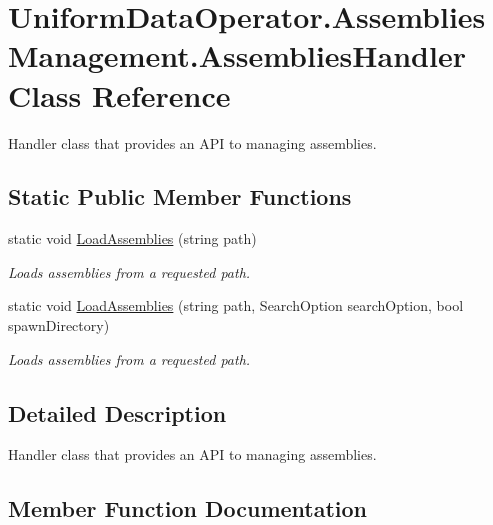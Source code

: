 \hypertarget{class_uniform_data_operator_1_1_assemblies_management_1_1_assemblies_handler}{}\section{Uniform\+Data\+Operator.\+Assemblies\+Management.\+Assemblies\+Handler Class Reference}
\label{class_uniform_data_operator_1_1_assemblies_management_1_1_assemblies_handler}


Handler class that provides an A\+PI to managing assemblies.  


\subsection*{Static Public Member Functions}
\begin{DoxyCompactItemize}
\item 
static void \mbox{\hyperlink{class_uniform_data_operator_1_1_assemblies_management_1_1_assemblies_handler_a6413bf47f459171f32c840afd92db34f}{Load\+Assemblies}} (string path)
\begin{DoxyCompactList}\small\item\em Loads assemblies from a requested path. \end{DoxyCompactList}\item 
static void \mbox{\hyperlink{class_uniform_data_operator_1_1_assemblies_management_1_1_assemblies_handler_a319a18fddc641dc2090dcf51ddcb015d}{Load\+Assemblies}} (string path, Search\+Option search\+Option, bool spawn\+Directory)
\begin{DoxyCompactList}\small\item\em Loads assemblies from a requested path. \end{DoxyCompactList}\end{DoxyCompactItemize}


\subsection{Detailed Description}
Handler class that provides an A\+PI to managing assemblies. 



\subsection{Member Function Documentation}
\mbox{\label{class_uniform_data_operator_1_1_assemblies_management_1_1_assemblies_handler_a6413bf47f459171f32c840afd92db34f}} 
